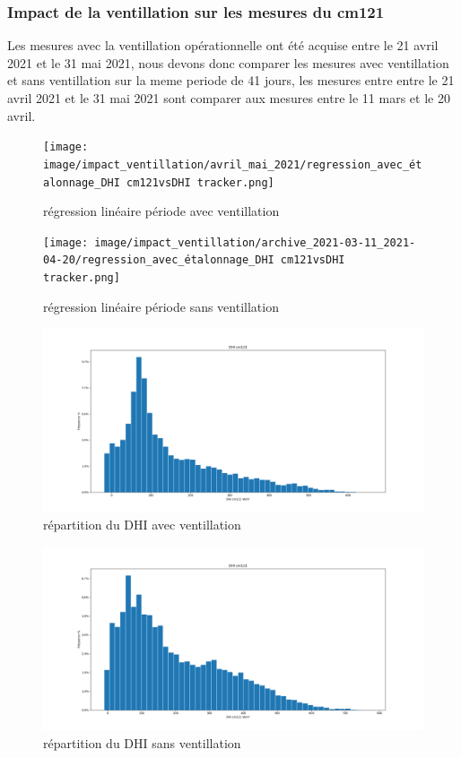 \documentclass[12pt,a4paper]{article}
\begin{document}
\begin{flushleft}
\subsubsection{Impact de la ventillation sur les mesures du cm121}

Les mesures avec la ventillation opérationnelle ont été acquise entre le 21 avril 2021 et le 31 mai 2021, nous devons donc comparer les mesures avec ventillation et sans ventillation sur la meme periode de 41 jours, les mesures entre  entre le 21 avril 2021 et le 31 mai 2021 sont comparer aux mesures entre le 11 mars et le 20 avril.

\begin{figure}[H]
\centering
\texttt{[image: image/impact\_ventillation/avril\_mai\_2021/regression\_avec\_étalonnage\_DHI cm121vsDHI tracker.png]} 
\caption{régression linéaire période avec ventillation}  
\end{figure}

\begin{figure}[H]
\centering
\texttt{[image: image/impact\_ventillation/archive\_2021-03-11\_2021-04-20/regression\_avec\_étalonnage\_DHI cm121vsDHI tracker.png]}  
\caption{régression linéaire période sans ventillation}  
\end{figure}

\begin{figure}[H]
\centering
\includegraphics[width=15cm]{image/impact_ventillation/avril_mai_2021/histogramme_3.png}  
\caption{répartition du DHI avec ventillation}  
\end{figure}

\begin{figure}[H]
\centering
\includegraphics[width=15cm]{image/impact_ventillation/archive_2021-03-11_2021-04-20/histogramme_3.png} 
\caption{répartition du DHI sans ventillation}  
\end{figure}


\end{flushleft}
\end{document}
